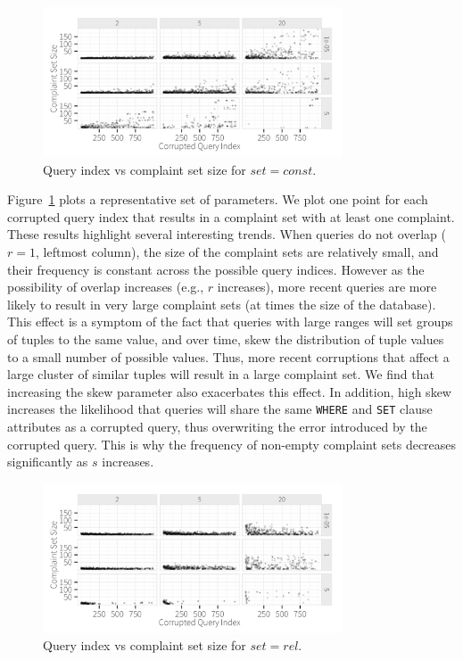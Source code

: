   \begin{figure}[h]
  \centering
  \includegraphics[width = 3.5in]{figures/qidxsimulation/qidx_v_ncomplaints_20attrs_const}
  \caption{Query index vs complaint set size for $set = const$.}
  \label{f:qidx_v_ncomplaints_const} 
  \end{figure}


Figure~\ref{f:qidx_v_ncomplaints_const} plots a representative set of parameters.  We plot one point
for each corrupted query index that results in a complaint set with at least one complaint. 
These results highlight several interesting trends.  When queries do not overlap ($r = 1$, leftmost column),
the size of the complaint sets are relatively small, and their frequency is constant across the possible query indices.
However as the possibility of overlap increases (e.g., $r$ increases), more recent queries are more likely to result in
very large complaint sets (at times the size of the database).   
This effect is a symptom of the fact that queries with large ranges will set groups of tuples to the same value,
and over time, skew the distribution of tuple values to a small number of possible values.
Thus, more recent corruptions that affect a large cluster of similar tuples will result in a large complaint set.
We find that increasing the skew parameter also exacerbates this effect.  
In addition, high skew increases the likelihood that queries will share the same \texttt{WHERE} and \texttt{SET} clause 
attributes as a corrupted query, thus overwriting the error introduced by the corrupted query.  
This is why the frequency of non-empty complaint sets decreases significantly as $s$ increases.


\begin{figure}[h]
\centering
\includegraphics[width = 3.5in]{figures/qidxsimulation/qidx_v_ncomplaints_20attrs_rel}
\caption{Query index vs complaint set size for $set = rel$.}
\label{f:qidx_v_ncomplaints_rel} 
\end{figure}

